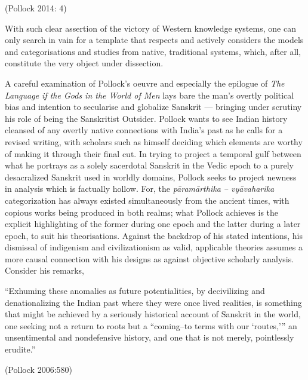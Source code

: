 \hfill (Pollock 2014: 4)

With such clear assertion of the victory of Western knowledge systems, one can only search in vain for a template that respects and actively considers the models and categorisations and studies from native, traditional systems, which, after all, constitute the very object under dissection.

A careful examination of Pollock’s oeuvre and especially the epilogue of \textit{The Language if the Gods in the World of Men} lays bare the man’s overtly political bias and intention to secularise and globalize Sanskrit — bringing under scrutiny his role of being the Sanskritist Outsider. Pollock wants to see Indian history cleansed of any overtly native connections with India’s past as he calls for a revised writing, with scholars such as himself deciding which elements are worthy of making it through their final cut. In trying to project a temporal gulf between what he portrays as a solely sacerdotal Sanskrit in the Vedic epoch to a purely desacralized Sanskrit used in worldly domains, Pollock seeks to project newness in analysis which is factually hollow. For, the \textit{pāramārthika – vyāvaharika} categorization has always existed simultaneously from the ancient times, with copious works being produced in both realms; what Pollock achieves is the explicit highlighting of the former during one epoch and the latter during a later epoch, to suit his theorisations. Against the backdrop of his stated intentions, his dismissal of indigenism and civilizationism as valid, applicable theories assumes a more causal connection with his designs as against objective scholarly analysis. Consider his remarks,

\begin{myquote}
“Exhuming these anomalies as future potentialities, by decivilizing and denationalizing the Indian past where they were once lived realities, is something that might be achieved by a seriously historical account of Sanskrit in the world, one seeking not a return to roots but a “coming–to terms with our ‘routes,’” an unsentimental and nondefensive history, and one that is not merely, pointlessly erudite.”
\end{myquote}

\hfill (Pollock 2006:580)

